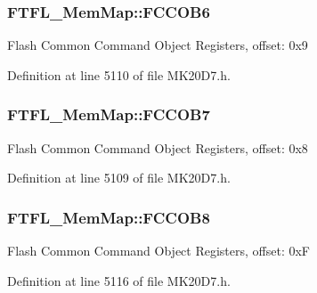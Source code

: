 \subsubsection[{\texorpdfstring{F\+C\+C\+O\+B6}{FCCOB6}}]{ F\+T\+F\+L\+\_\+\+Mem\+Map\+::\+F\+C\+C\+O\+B6}\hypertarget{struct_f_t_f_l___mem_map_a661359a2b3312515c58c2e1f5d07bf9a}{}\label{struct_f_t_f_l___mem_map_a661359a2b3312515c58c2e1f5d07bf9a}
Flash Common Command Object Registers, offset\+: 0x9 

Definition at line 5110 of file M\+K20\+D7.\+h.

\subsubsection[{\texorpdfstring{F\+C\+C\+O\+B7}{FCCOB7}}]{ F\+T\+F\+L\+\_\+\+Mem\+Map\+::\+F\+C\+C\+O\+B7}\hypertarget{struct_f_t_f_l___mem_map_a9bf5317162d58085b6dc94e071a57e32}{}\label{struct_f_t_f_l___mem_map_a9bf5317162d58085b6dc94e071a57e32}
Flash Common Command Object Registers, offset\+: 0x8 

Definition at line 5109 of file M\+K20\+D7.\+h.

\subsubsection[{\texorpdfstring{F\+C\+C\+O\+B8}{FCCOB8}}]{ F\+T\+F\+L\+\_\+\+Mem\+Map\+::\+F\+C\+C\+O\+B8}\hypertarget{struct_f_t_f_l___mem_map_a3d368bde5a37697df8e4a3f6fba2dada}{}\label{struct_f_t_f_l___mem_map_a3d368bde5a37697df8e4a3f6fba2dada}
Flash Common Command Object Registers, offset\+: 0xF 

Definition at line 5116 of file M\+K20\+D7.\+h.


